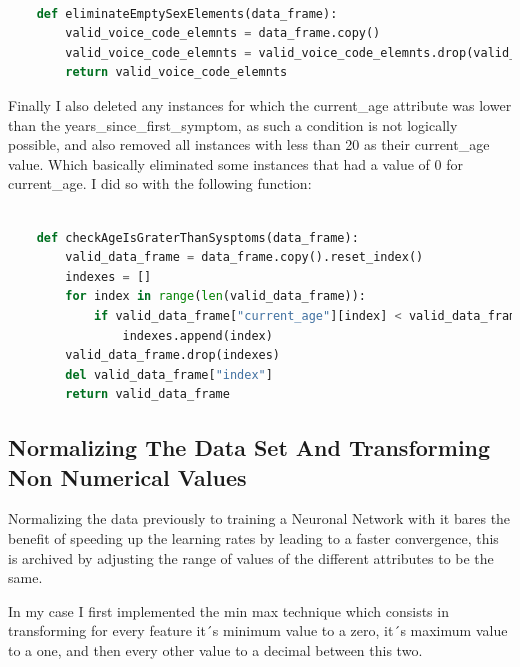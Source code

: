 \documentclass[12pt, a4paper]{article}
\begin{document}
	\vspace{5mm}
	
	\begin{lstlisting}[language=Python]
		
	def eliminateEmptySexElements(data_frame):
		valid_voice_code_elemnts = data_frame.copy()
		valid_voice_code_elemnts = valid_voice_code_elemnts.drop(valid_voice_code_elemnts[valid_voice_code_elemnts["voice_code"] == "" ].index)
		return valid_voice_code_elemnts
	\end{lstlisting}
	
	Finally I also deleted any instances for which the current\_age attribute was lower than the years\_since\_first\_symptom, as such a condition is not logically possible, and also removed all instances with less than 20 as their current\_age value. Which basically eliminated some instances that had a value of 0 for current\_age. I did so with the following function:
	
	\vspace{5mm}
	
	\begin{lstlisting}[language=Python]
		
	def checkAgeIsGraterThanSysptoms(data_frame):
		valid_data_frame = data_frame.copy().reset_index()
		indexes = []
		for index in range(len(valid_data_frame)):
			if valid_data_frame["current_age"][index] < valid_data_frame["years_since_first_symptom"][index] or valid_data_frame["current_age"][index] < 20:
				indexes.append(index)
		valid_data_frame.drop(indexes)
		del valid_data_frame["index"]
		return valid_data_frame
	\end{lstlisting}
	
	\clearpage
	
	\subsection{Normalizing The Data Set And Transforming Non Numerical Values }
	
	Normalizing the data previously to training a Neuronal Network with it bares the benefit of speeding up the learning rates by leading to a faster convergence, this is archived by adjusting the range of values of the different attributes to be the same.\cite{normalization}
	
	In my case I first implemented the min max technique which consists in transforming for every feature it´s minimum value to a zero, it´s maximum value to a one, and then every other value to a decimal between this two.\cite{normalizationTechniques}
	
\end{document}
